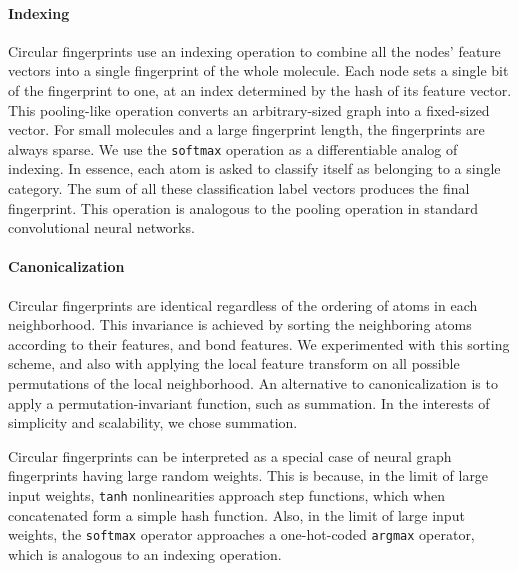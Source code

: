 \documentclass{article}
\begin{document}
\paragraph{Indexing}
Circular fingerprints use an indexing operation to combine all the nodes' feature vectors into a single fingerprint of the whole molecule.
Each node sets a single bit of the fingerprint to one, at an index determined by the hash of its feature vector.
This pooling-like operation converts an arbitrary-sized graph into a fixed-sized vector.
For small molecules and a large fingerprint length, the fingerprints are always sparse.
We use the \texttt{softmax} operation as a differentiable analog of indexing.
In essence, each atom is asked to classify itself as belonging to a single category.
The sum of all these classification label vectors produces the final fingerprint.
This operation is analogous to the pooling operation in standard convolutional neural networks.

\paragraph{Canonicalization}
Circular fingerprints are identical regardless of the ordering of atoms in each neighborhood.
This invariance is achieved by sorting the neighboring atoms according to their features, and bond features.
We experimented with this sorting scheme, and also with applying the local feature transform on all possible permutations of the local neighborhood.
An alternative to canonicalization is to apply a permutation-invariant function, such as summation.
In the interests of simplicity and scalability, we chose summation.

\label{sec:random is equivalent}
Circular fingerprints can be interpreted as a special case of neural graph fingerprints having large random weights.
This is because, in the limit of large input weights, \texttt{tanh} nonlinearities approach step functions, which when concatenated form a simple hash function.
Also, in the limit of large input weights, the \texttt{softmax} operator approaches a one-hot-coded \texttt{argmax} operator, which is analogous to an indexing operation.
\end{document}
